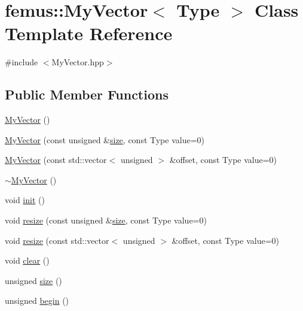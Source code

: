 \hypertarget{classfemus_1_1_my_vector}{}\section{femus\+:\+:My\+Vector$<$ Type $>$ Class Template Reference}
\label{classfemus_1_1_my_vector}


{\ttfamily \#include $<$My\+Vector.\+hpp$>$}

\subsection*{Public Member Functions}
\begin{DoxyCompactItemize}
\item 
\mbox{\hyperlink{classfemus_1_1_my_vector_a891b2c251619b6a9995a53cedf2e0c40}{My\+Vector}} ()
\item 
\mbox{\hyperlink{classfemus_1_1_my_vector_a8ba1201c2e7bc237b58487190b341362}{My\+Vector}} (const unsigned \&\mbox{\hyperlink{classfemus_1_1_my_vector_aee4dc1225adaac2f96cacbf36d84a06a}{size}}, const Type value=0)
\item 
\mbox{\hyperlink{classfemus_1_1_my_vector_a3ed238cfe3bceb16b6c94fa2a9a6a79c}{My\+Vector}} (const std\+::vector$<$ unsigned $>$ \&offset, const Type value=0)
\item 
\mbox{\hyperlink{classfemus_1_1_my_vector_a9ad9f54fb83df4cb645ff2fc6b33d88f}{$\sim$\+My\+Vector}} ()
\item 
void \mbox{\hyperlink{classfemus_1_1_my_vector_a6b978e8662f316acc89686030bcfcfb6}{init}} ()
\item 
void \mbox{\hyperlink{classfemus_1_1_my_vector_a405d0e5b8aad21bddeb7660173571857}{resize}} (const unsigned \&\mbox{\hyperlink{classfemus_1_1_my_vector_aee4dc1225adaac2f96cacbf36d84a06a}{size}}, const Type value=0)
\item 
void \mbox{\hyperlink{classfemus_1_1_my_vector_a542131887a5cbabd62263d2747608775}{resize}} (const std\+::vector$<$ unsigned $>$ \&offset, const Type value=0)
\item 
void \mbox{\hyperlink{classfemus_1_1_my_vector_ac789552a08caad37949488d5b203a9e4}{clear}} ()
\item 
unsigned \mbox{\hyperlink{classfemus_1_1_my_vector_aee4dc1225adaac2f96cacbf36d84a06a}{size}} ()
\item 
unsigned \mbox{\hyperlink{classfemus_1_1_my_vector_a21d4832fe66e6c3b600b8afe35a27e87}{begin}} ()
\item 

\end{DoxyCompactItemize}
